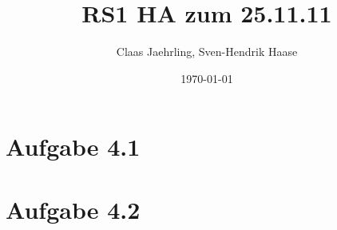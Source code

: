 \documentclass[12pt]{article}
\author{Claas Jaehrling, Sven-Hendrik Haase}
\title{RS1 HA zum 25.11.11}
\date{\today}
\begin{document}
\setcounter{secnumdepth}{0}
\maketitle

\section{Aufgabe 4.1}


\section{Aufgabe 4.2}
\end{document}
